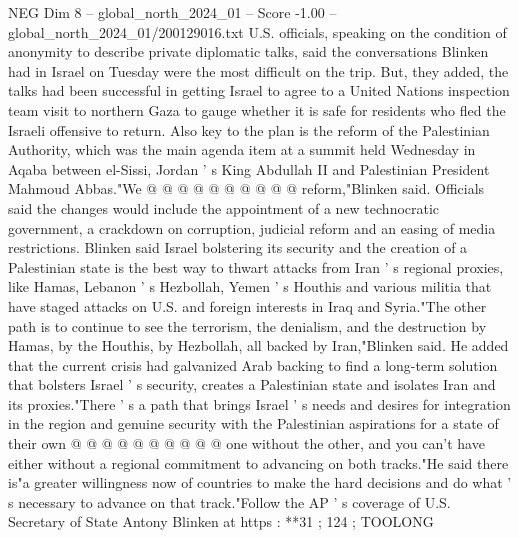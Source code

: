 \begin{textsample}{NEG Dim 8 – global\_north\_2024\_01 – Score -1.00 – global\_north\_2024\_01/200129016.txt}
U.S. officials, speaking on the condition of anonymity to describe private diplomatic talks, said the conversations Blinken had in Israel on Tuesday were the most difficult on the trip.
But, they added, the talks had been successful in getting Israel to agree to a United Nations inspection team visit to northern Gaza to gauge whether it is safe for residents who fled the Israeli offensive to return.
Also key to the plan is the reform of the Palestinian Authority, which was the main agenda item at a summit held Wednesday in Aqaba between el-Sissi, Jordan ' s King Abdullah II and Palestinian President Mahmoud Abbas."We @ @ @ @ @ @ @ @ @ @ reform,"Blinken said.
Officials said the changes would include the appointment of a new technocratic government, a crackdown on corruption, judicial reform and an easing of media restrictions.
Blinken said Israel bolstering its security and the creation of a Palestinian state is the best way to thwart attacks from Iran ' s regional proxies, like Hamas, Lebanon ' s Hezbollah, Yemen ' s Houthis and various militia that have staged attacks on U.S. and foreign interests in Iraq and Syria."The other path is to continue to see the terrorism, the denialism, and the destruction by Hamas, by the Houthis, by Hezbollah, all backed by Iran,"Blinken said.
He added that the current crisis had galvanized Arab backing to find a long-term solution that bolsters Israel ' s security, creates a Palestinian state and isolates Iran and its proxies."There ' s a path that brings Israel ' s needs and desires for integration in the region and genuine security with the Palestinian aspirations for a state of their own @ @ @ @ @ @ @ @ @ @ one without the other, and you can't have either without a regional commitment to advancing on both tracks."He said there is"a greater willingness now of countries to make the hard decisions and do what ' s necessary to advance on that track."Follow the AP ' s coverage of U.S.
Secretary of State Antony Blinken at https : **31 ; 124 ; TOOLONG

\end{textsample}
